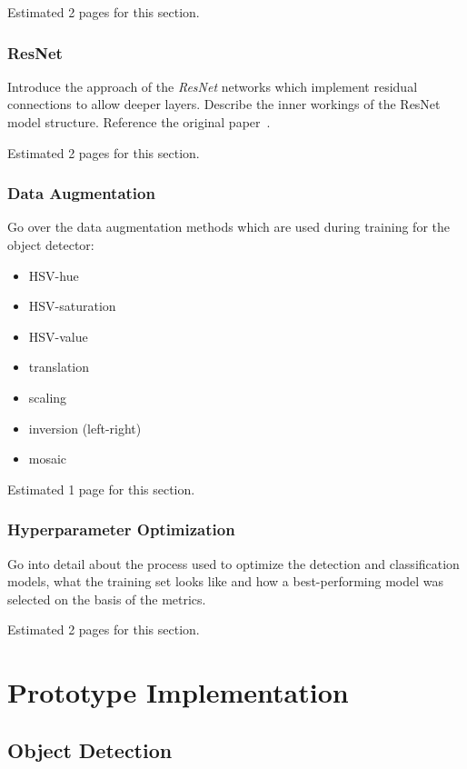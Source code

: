 \documentclass[draft,final]{vutinfth} %
\begin{document}
Estimated 2 pages for this section.

\subsection{ResNet}
\label{sec:methods-classification}

Introduce the approach of the \emph{ResNet} networks which implement
residual connections to allow deeper layers. Describe the inner
workings of the ResNet model structure. Reference the original
paper~\cite{he2016}.

Estimated 2 pages for this section.

\subsection{Data Augmentation}
\label{sec:methods-augmentation}

Go over the data augmentation methods which are used during training
for the object detector:
\begin{itemize}
\item HSV-hue
\item HSV-saturation
\item HSV-value
\item translation
\item scaling
\item inversion (left-right)
\item mosaic
\end{itemize}

Estimated 1 page for this section.

\subsection{Hyperparameter Optimization}
\label{sec:methods-hypopt}

Go into detail about the process used to optimize the detection and
classification models, what the training set looks like and how a
best-performing model was selected on the basis of the metrics.

Estimated 2 pages for this section.

\chapter{Prototype Implementation}
\label{chap:implementation}

\section{Object Detection}
\label{sec:development-detection}
\end{document}
